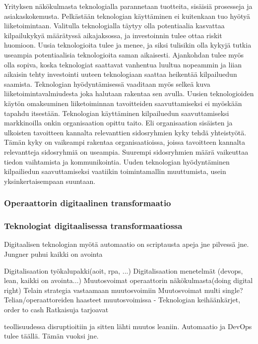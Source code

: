 \documentclass[finnish,12pt,a4paper,pdftex]{article}
\begin{document}
Yrityksen näkökulmasta teknologialla parannetaan tuotteita, sisäisiä prosesseja ja asiakaskokemusta. Pelkästään teknologian käyttäminen ei kuitenkaan tuo hyötyä liiketoimintaan. Valitulla teknologialla täytyy olla potentiaalia kasvattaa kilpailukykyä määrätyssä aikajaksossa, ja investoinnin tulee ottaa riskit huomioon. Uusia teknologioita tulee ja menee, ja siksi tulisikin olla kykyjä tutkia useampia potentiaalisia teknologioita saman aikaisesti. Ajankohdan tulee myös olla sopiva, koska teknologiat saattavat vanhentua luultua nopeammin ja liian aikaisin tehty investointi uuteen teknologiaan saattaa heikentää kilpailuedun saamista. Teknologian hyödyntämisessä vaaditaan myös selkeä kuva liiketoimintavalmiudesta joka halutaan rakentaa sen avulla. Uusien teknologioiden käytön omaksuminen liiketoiminnan tavoitteiden saavuttamiseksi ei myöskään tapahdu itsestään. Teknologian käyttäminen kilpailuedun saavuttamiseksi markkinoilla onkin organisaation opittu taito. Eli organisaation sisäisten ja ulkoisten tavoitteen kannalta relevanttien sidosryhmien kyky tehdä yhteistyötä. Tämän kyky on vaikeampi rakentaa organisaatioissa, joissa tavoitteen kannalta relevantteja sidosryhmiä on useampia. Suurempi sidosryhmien määrä vaikeuttaa tiedon vaihtamista ja kommunikointia. Uuden teknologian hyödyntäminen kilpailiedun saavuttamiseksi vaatiikin toimintamallin muuttumista, usein yksinkertaisempaan suuntaan.

\subsubsection{Operaattorin digitaalinen transformaatio}

\subsubsection{Teknologiat digitaalisessa transformaatiossa}

Digitaalisen teknologian myötä automaatio on scriptausta apeja jne pilvessä jne. Jungner puhui kaikki on avointa



Digitalisaation työkalupakki(aoit, rpa, ...)
Digitalisaation menetelmät (devops, lean, kaikki on avointa...)
Muutosvoimat operaattorin näkökulmasta(doing digital right)
Telain strategia vastaamaan muutosvoimiin
Muutosvoimat
multi single?
Telian/operaattoreiden haasteet muutosvoimissa
- Teknologian keihäänkärjet, order to cash
Ratkaisuja tarjoavat 

teollisuudessa disruptioitiin ja sitten lähti muutos leaniin.
Automaatio ja DevOps tulee täällä. Tämän vuoksi jne.
\end{document}
